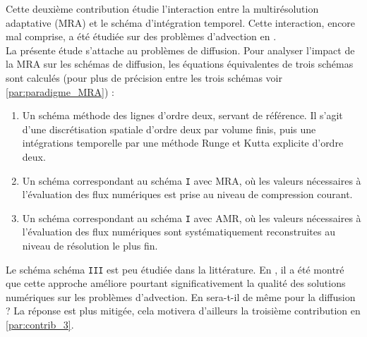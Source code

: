 Cette deuxième contribution étudie l'interaction entre la multirésolution adaptative (MRA) et le schéma d'intégration temporel. 
Cette interaction, encore mal comprise, a été étudiée sur des problèmes d'advection en \cite{belloti_et_al_2025}.\\
La présente étude s'attache au problèmes de diffusion. 
Pour analyser l'impact de la MRA sur les schémas de diffusion,
les équations équivalentes de trois schémas sont calculés (pour plus de précision entre les trois schémas voir \ref{par:paradigme_MRA}) : 
\begin{enumerate}
    \renewcommand{\labelenumi}{\Roman{enumi}.}
    \item Un schéma méthode des lignes d'ordre deux, servant de référence. Il s'agit d'une discrétisation spatiale d'ordre deux par volume finis, 
    puis une intégrations temporelle par une méthode Runge et Kutta explicite d'ordre deux.
    \item Un schéma correspondant au schéma \texttt{I} avec MRA, où les valeurs nécessaires à l'évaluation des flux numériques 
    est prise au niveau de compression courant.
    \item Un schéma correspondant au schéma \texttt{I} avec AMR, où les valeurs nécessaires à l'évaluation des flux numériques 
    sont systématiquement reconstruites au niveau de résolution le plus fin.
\end{enumerate}

Le schéma schéma \texttt{III} est peu étudiée dans la littérature.
En \cite{belloti_et_al_2025}, il a été montré que cette approche améliore pourtant significativement la qualité des solutions numériques sur les problèmes d'advection.
En sera-t-il de même pour la diffusion ? La réponse est plus mitigée, cela motivera d'ailleurs la troisième contribution en \ref{par:contrib_3}.